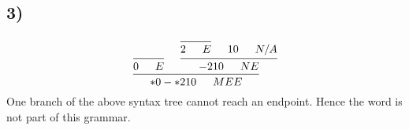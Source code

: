 \documentclass{article}
\theoremstyle{definition}
\theoremstyle{remark}
\begin{document}
\subsection{3)}
\[
\begin{prooftree}
            \hypo{}
        \infer 1 {0 \enskip \quad E}
                \hypo {}
            \infer 1 {2 \enskip \quad E}
            \hypo {1 0 \enskip \quad N/A}
        \infer 2 {-2 1 0 \enskip \quad NE}
    \infer 2 {* 0 - *2 1 0 \enskip \quad MEE}
\end{prooftree}
\]
One branch of the above syntax tree cannot reach an endpoint. Hence the word is not part of this grammar.
\end{document}
